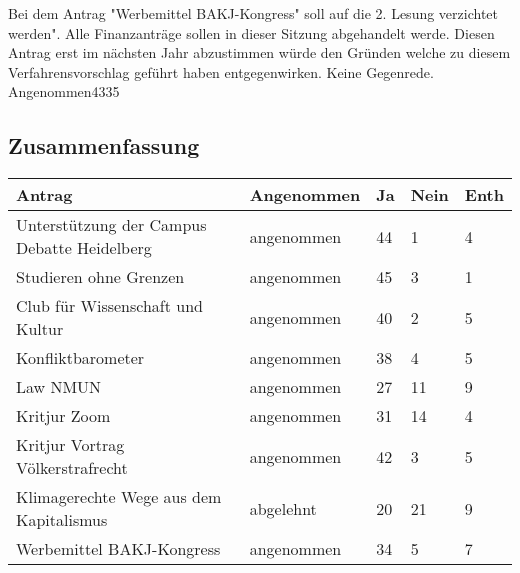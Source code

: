 {
    Bei dem Antrag "Werbemittel BAKJ-Kongress" soll auf die 2. Lesung verzichtet werden".
}{
    Alle Finanzanträge sollen in dieser Sitzung abgehandelt werde. Diesen Antrag erst im nächsten Jahr abzustimmen würde den Gründen welche zu diesem Verfahrensvorschlag geführt haben entgegenwirken.
}{
    Keine Gegenrede.
}{Angenommen}{43}{3}{5}
\subsection{Zusammenfassung}
\begin{center}
    \begin{tabular}{|p{6cm}|m{2cm}|m{1cm}|m{1cm}|m{1cm}|}
        \hline
        Antrag & Angenommen & Ja & Nein & Enth\\\hline
        Unterstützung der Campus Debatte Heidelberg & angenommen & 44 & 1 & 4\\\hline
        Studieren ohne Grenzen & angenommen & 45 & 3 & 1\\\hline
        Club für Wissenschaft und Kultur & angenommen & 40 & 2 & 5\\\hline
        Konfliktbarometer & angenommen & 38 & 4 & 5\\\hline
        Law NMUN & angenommen & 27 & 11 & 9\\\hline
        Kritjur Zoom & angenommen & 31 & 14 & 4\\\hline
        Kritjur Vortrag Völkerstrafrecht & angenommen & 42 & 3 & 5\\\hline
        Klimagerechte Wege aus dem Kapitalismus & abgelehnt & 20 & 21 & 9\\\hline
        Werbemittel BAKJ-Kongress & angenommen & 34 & 5 & 7\\\hline
    \end{tabular}
\end{center}